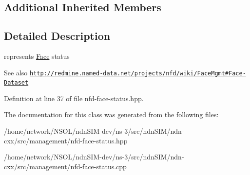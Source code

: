 \subsection*{Additional Inherited Members}


\subsection{Detailed Description}
represents \hyperlink{classndn_1_1Face}{Face} status 

\begin{DoxySeeAlso}{See also}
\href{http://redmine.named-data.net/projects/nfd/wiki/FaceMgmt#Face-Dataset}{\tt http\+://redmine.\+named-\/data.\+net/projects/nfd/wiki/\+Face\+Mgmt\#\+Face-\/\+Dataset} 
\end{DoxySeeAlso}


Definition at line 37 of file nfd-\/face-\/status.\+hpp.



The documentation for this class was generated from the following files\+:\begin{DoxyCompactItemize}
\item 
/home/network/\+N\+S\+O\+L/ndn\+S\+I\+M-\/dev/ns-\/3/src/ndn\+S\+I\+M/ndn-\/cxx/src/management/nfd-\/face-\/status.\+hpp\item 
/home/network/\+N\+S\+O\+L/ndn\+S\+I\+M-\/dev/ns-\/3/src/ndn\+S\+I\+M/ndn-\/cxx/src/management/nfd-\/face-\/status.\+cpp\end{DoxyCompactItemize}
